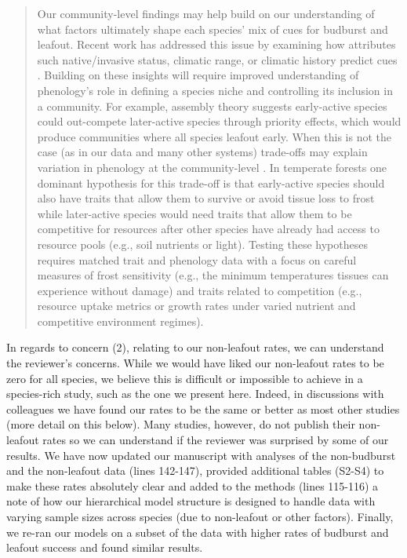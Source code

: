 \documentclass[11pt,a4paper]{article}
\begin{document}
\begin{quote}
Our community-level findings may help build on our understanding of what factors ultimately shape each species' mix of cues for budburst and leafout. Recent work has addressed this issue by examining how attributes such native/invasive status, climatic range, or climatic history predict cues \citep[e.g.,][]{Laube2015,zohner2017}. Building on these insights will require improved understanding of phenology's role in defining a species niche and controlling its inclusion in a community. For example, assembly theory suggests early-active species could out-compete later-active species through priority effects, which would produce communities where all species leafout early. When this is not the case (as in our data and many other systems) trade-offs may explain variation in phenology at the community-level \citep{Chesson:1997dz}. In temperate forests one dominant hypothesis for this trade-off is that early-active species should also have traits that allow them to survive or avoid tissue loss to frost \citep{Sakai:1987aa} while later-active species would need traits that allow them to be competitive for resources after other species have already had access to resource pools (e.g., soil nutrients or light). Testing these hypotheses requires matched trait and phenology data with a focus on careful measures of frost sensitivity (e.g., the minimum temperatures tissues can experience without damage) and traits related to competition (e.g., resource uptake metrics or growth rates under varied nutrient and competitive environment regimes).
\end{quote}

In regards to concern (2), relating to our non-leafout rates, we can understand the reviewer's concerns. While we would have liked our non-leafout rates to be zero for all species, we believe this is difficult or impossible to achieve in a species-rich study, such as the one we present here. Indeed, in discussions with colleagues we have found our rates to be the same or better as most other studies (more detail on this below). Many studies, however, do not publish their non-leafout rates so we can understand if the reviewer was surprised by some of our results. We have now updated our manuscript with analyses of the non-budburst and the non-leafout data (lines 142-147), provided additional tables (S2-S4) to make these rates absolutely clear and added to the methods (lines 115-116) a note of how our hierarchical model structure is designed to handle data with varying sample sizes across species (due to non-leafout or other factors). Finally, we re-ran our models on a subset of the data with higher rates of budburst and leafout success and found similar results. \\
\end{document}
